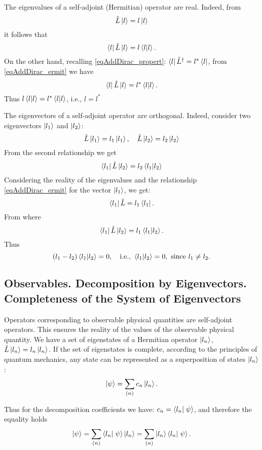 The eigenvalues of a self-adjoint (Hermitian) operator are real. Indeed, from 
\[
\hat{L} \ket{ l } = l \ket{ l }
\]
it follows that 
\[
\bra{ l } \hat{L} \ket{ l } = l \bra{ l }
\ket{ l }.
\]
On the other hand, recalling \eqref{eqAddDirac_propert}:
$\bra{ l } \hat{L}^{\dag} = l^{*} \bra{ l }$, from
\eqref{eqAddDirac_ermit} we have
\[
\bra{ l } \hat{L} \ket{ l } = l^{*} \bra{ l }
\ket{ l }.
\] 
Thus $l\bra{ l }
\ket{ l } = l^{*}\bra{ l }
\ket{ l }$, i.e., $l  = l^{*}$

The eigenvectors of a self-adjoint operator are orthogonal. 
Indeed, consider two eigenvectors 
$\ket{ l_1 }$ and $\ket{ l_2 }$:
\[
\hat{L} \ket{ l_1 } = l_1 \ket{ l_1 }, \quad
\hat{L} \ket{ l_2 } = l_2 \ket{ l_2 }
\]
From the second relationship we get
\[
\bra{ l_1 } \hat{L} \ket{ l_2 } = l_2 \bra{ l_1 } \ket{ l_2 }
\]
Considering the reality of the eigenvalues and the relationship
\eqref{eqAddDirac_ermit} for the vector $\ket{ l_1 }$, we get:
\[
\bra{ l_1 } \hat{L} = l_1 \bra{ l_1 }.
\]
From where
\[
\bra{ l_1 } \hat{L} \ket{ l_2 } = l_1 \bra{ l_1 } \ket{ l_2 }.
\] 
Thus
\[
\left(l_1 - l_2\right) \bra{ l_1 } \ket{ l_2 } = 0, 
\quad \mbox{i.e., } \bra{ l_1 } \ket{ l_2 } = 0,
\mbox{ since } l_1 \neq l_2.
\] 

\subsection{Observables. Decomposition by Eigenvectors.  
Completeness of the System of Eigenvectors}
Operators corresponding to observable physical quantities are
self-adjoint operators. This ensures the reality of the values of the observable physical quantity. We have a set of eigenstates of a Hermitian operator  
$\ket{ l_n }$,  $\hat{L} \ket{ l_n } = l_n \left| l_n
\right>$.  If the set of eigenstates is complete, according to the principles
of quantum mechanics, any state can be represented as a superposition
of states $\ket{ l_n }$:
\begin{equation}  
\left| \psi \right> = \sum_{(n)} c_n \ket{ l_n }.
\end{equation}  

Thus for the decomposition coefficients we have:  
$c_n = \bra{ l_n } \left. \psi \right>$, and therefore
the equality holds
\begin{equation}  
\left| \psi \right> = \sum_{(n)} \bra{ l_n } \left. \psi
\right> \ket{ l_n } = 
\sum_{(n)} \ket{ l_n } \bra{ l_n } \left. \psi
\right>.
\label{eqAddDirac_full}
\end{equation}  


